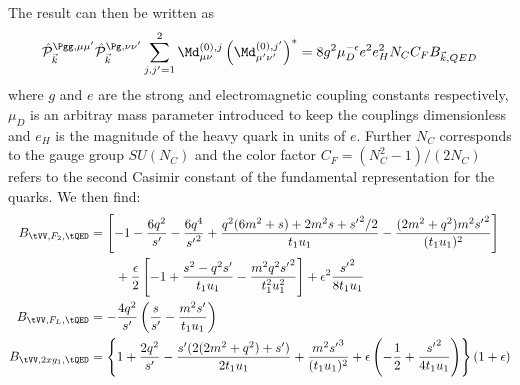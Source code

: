 The result can then be written as
\begin{equation}
\hat {\mathcal P}_{\vec k}^{\Pgg,\mu\mu'}\hat {\mathcal P}_{\vec k}^{\Pg,\nu\nu'}\sum_{j,j'=1}^2\Md^{(0),j}_{\mu\nu}\left(\Md^{(0),j'}_{\mu'\nu'}\right)^* = 8g^2\mu_D^{-\epsilon}e^2e_H^2 N_C C_F B_{\vec k,QED}
\end{equation}
where $g$ and $e$ are the strong and electromagnetic coupling constants respectively, $\mu_D$ is an arbitray mass parameter introduced to keep the couplings dimensionless and $e_H$ is the magnitude of the heavy quark in units of $e$. Further $N_C$ corresponds to the gauge group $SU(N_C)$ and the color factor $C_F=(N_C^2-1)/(2N_C)$ refers to the second Casimir constant of the fundamental representation for the quarks. We then find:
\begin{align}
B_{\tVV,F_2,\tQED} &= \left[-1 - \frac{6q^2}{s'} - \frac{6q^4}{{s'}^2} + \frac{q^2(6m^2+s) +2m^2 s + {s'}^2/2}{t_1u_1} - \frac{(2m^2+q^2)m^2{s'}^2}{(t_1 u_1)^2} \right] \nonumber\\
 &\hspace{20pt}+\frac{\epsilon}{2}\left[ -1 + \frac{s^2-q^2s'}{t_1u_1} - \frac{m^2q^2{s'}^2}{t_1^2u_1^2} \right] + \epsilon^2\frac{{s'}^2}{8t_1u_1}\\
B_{\tVV,F_L,\tQED} &= -\frac{4q^2}{s'}\left(\frac s {s'} - \frac{m^2s'}{t_1u_1}\right)\\
B_{\tVV,2xg_1,\tQED} &= \left\{1+ \frac{2q^2}{s'} - \frac{s'(2(2m^2+q^2)+s')}{2t_1 u_1} + \frac{m^2{s'}^3}{(t_1u_1)^2}+\epsilon\left(-\frac 1 2 + \frac{{s'}^2}{4t_1u_1}\right)\right\}(1+\epsilon)
\end{align}
